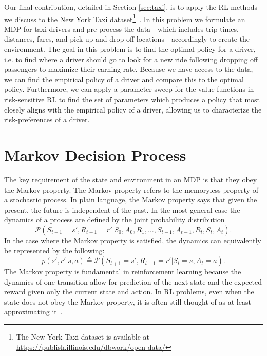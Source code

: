 \documentclass{article}
\newcommand{\mc}{\mathcal}
\begin{document}
Our final contribution, detailed in Section \ref{sec:taxi}, is to apply the RL methods we discuss to the New York Taxi dataset\footnote{The New York Taxi dataset is available at \url{https://publish.illinois.edu/dbwork/open-data/}}~\cite{donovan2014new}. In this problem we formulate an MDP for taxi drivers and pre-process the data---which includes trip times, distances, fares, and pick-up and drop-off locations---accordingly to create the environment. The goal in this problem is to find the optimal policy for a driver, i.e. to find where a driver should go to look for a new ride following dropping off passengers to maximize their earning rate. Because we have access to the data, we can find the empirical policy of a driver and compare this to the optimal policy. Furthermore, we can apply a parameter sweep for the value functions in risk-sensitive RL to find the set of parameters which produces a policy that most closely aligns with the empirical policy of a driver, allowing us to characterize the risk-preferences of a driver.

\section{Markov Decision Process}\label{sec:mdp}
The key requirement of the state and environment in an MDP is that they obey the Markov property. The Markov property refers to the memoryless property of a stochastic process. In plain language, the Markov property says that given the present, the future is independent of the past. In the most general case the dynamics of a process are defined by the joint probability distribution
\begin{equation}
\mc{P}(S_{t+1}=s', R_{t+1}=r'|S_0, A_0, R_1, \dots, S_{t-1}, A_{t-1}, R_t, S_t, A_t).
\end{equation}
In the case where the Markov property is satisfied, the dynamics can equivalently be represented by the following:
\begin{equation}\label{eq:dynamics}
p(s', r'|s, a) \triangleq \mc{P}(S_{t+1}=s', R_{t+1}=r'|S_t=s, A_t=a).
\end{equation}
The Markov property is fundamental in reinforcement learning because the dynamics of one transition allow for prediction of the next state and the expected reward given only the current state and action. In RL problems, even when the state does not obey the Markov property, it is often still thought of as at least approximating it~\cite{sutton1998reinforcement}.
\end{document}
